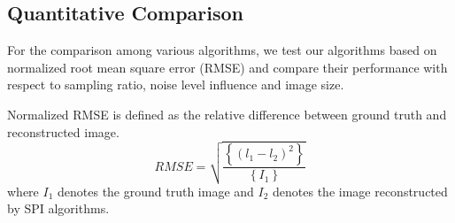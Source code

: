 \documentclass[conference]{IEEEtran}
\begin{document}
\subsection{Quantitative Comparison }
\par For the comparison among various algorithms, we test our algorithms based on normalized root mean square error (RMSE) and compare their performance with respect to sampling ratio, noise level influence and image size.\par
Normalized RMSE is defined as the relative difference between ground truth and reconstructed image.
\begin{equation}
    RMSE=\sqrt{\frac{\left \{ (l_{1}-l_{2})^2 \right \}}{\left \{ I_{1} \right \}}}
\end{equation}
where $I_{1}$ denotes the ground truth image and $I_{2}$ denotes the image reconstructed by SPI algorithms.
\end{document}
